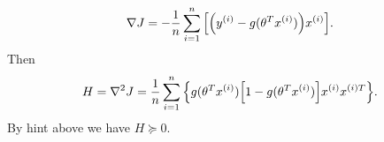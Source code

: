 \begin{answer}
	\[
		\nabla J
		=
		-\frac{1}{n}\sum^{n}_{i=1} \qty[\qty(y^{(i)}-g(\theta^Tx^{(i)}))x^{(i)}]
	.\] 
	Then
	\[
	    H=\nabla^2 J
		=
		\frac{1}{n}\sum^{n}_{i=1} 
		\qty{g(\theta^Tx^{(i)})\qty[1-g(\theta^Tx^{(i)})]x^{(i)}x^{(i)T}}
	.\] 
	By hint above we have $H\succeq 0$.
\end{answer}
